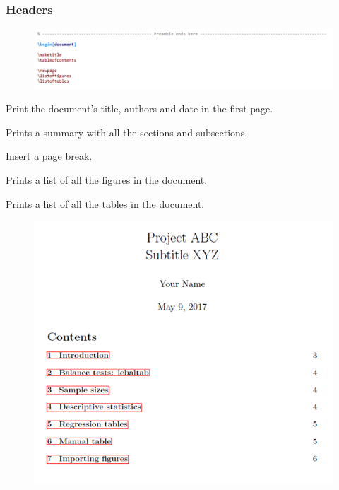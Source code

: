 \documentclass{beamer}
\begin{document}
\begin{frame}[fragile]
	\frametitle{Headers}
	\begin{figure}
		\centering
		\includegraphics[width=1\linewidth]{header}
	\end{figure}
	\begin{multicols}{2}
		[]
	\begin{description}
		\tiny
		\item[maketitle] Print the document's title, authors and date in the first page.
		\item[tableofcontents] Prints a summary with all the sections and subsections.
		\item[newpage] Insert a page break.
		\item[listoffigures] Prints a list of all the figures in the document.
		\item[listoftables] Prints a list of all the tables in the document.\
	\end{description}
	\columnbreak
	\begin{figure}
		\centering
		\includegraphics[width=0.8\linewidth]{preamble12}
	\end{figure}
	
	\end{multicols}
	
\end{frame}
\end{document}
